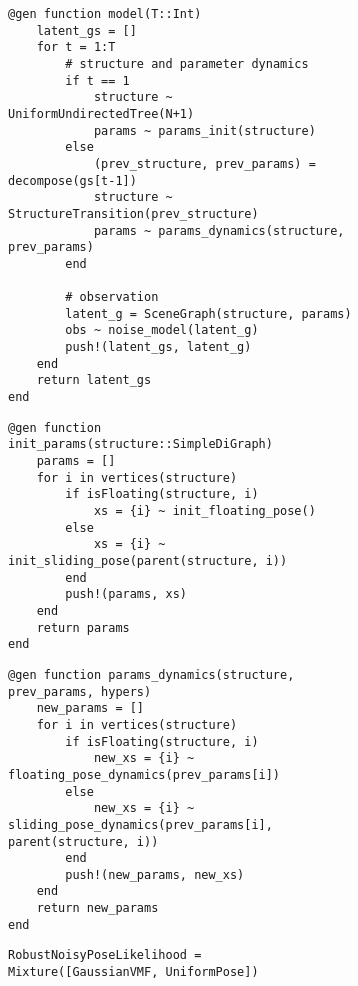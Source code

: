 \begin{figure}[H]
\centering
\begin{subfigure}{\textwidth}
\begin{lstlisting}
@gen function model(T::Int)
    latent_gs = []
    for t = 1:T
        # structure and parameter dynamics
        if t == 1
            structure ~ UniformUndirectedTree(N+1)
            params ~ params_init(structure)
        else
            (prev_structure, prev_params) = decompose(gs[t-1])
            structure ~ StructureTransition(prev_structure)
            params ~ params_dynamics(structure, prev_params)
        end

        # observation
        latent_g = SceneGraph(structure, params)
        obs ~ noise_model(latent_g)
        push!(latent_gs, latent_g)
    end
    return latent_gs
end
\end{lstlisting}
\end{subfigure}

\begin{subfigure}{\textwidth}
\begin{lstlisting}
@gen function init_params(structure::SimpleDiGraph)
    params = []
    for i in vertices(structure)
        if isFloating(structure, i)
            xs = {i} ~ init_floating_pose()
        else
            xs = {i} ~ init_sliding_pose(parent(structure, i))
        end
        push!(params, xs)
    end
    return params
end
\end{lstlisting}
\end{subfigure}

\begin{subfigure}{\textwidth}
\begin{lstlisting}
@gen function params_dynamics(structure, prev_params, hypers)
    new_params = []
    for i in vertices(structure)
        if isFloating(structure, i)
            new_xs = {i} ~ floating_pose_dynamics(prev_params[i])
        else
            new_xs = {i} ~ sliding_pose_dynamics(prev_params[i], parent(structure, i))
        end
        push!(new_params, new_xs)
    end
    return new_params
end
\end{lstlisting}
\end{subfigure}

\begin{subfigure}{\textwidth}
\begin{lstlisting}
RobustNoisyPoseLikelihood = Mixture([GaussianVMF, UniformPose])


\end{lstlisting}
\end{subfigure}
\end{figure}
